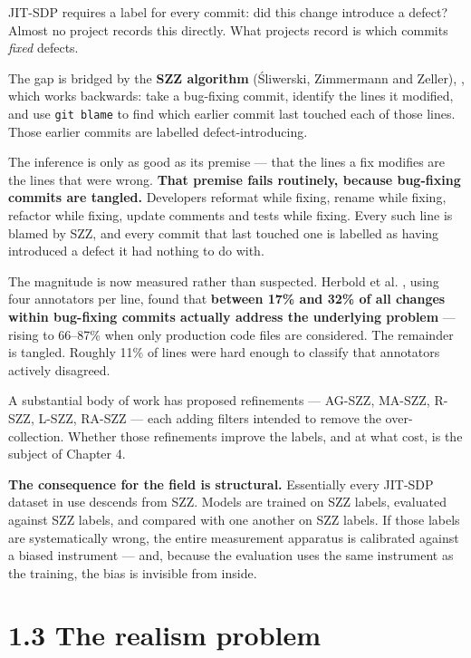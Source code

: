 JIT-SDP requires a label for every commit: did this change introduce a
defect? Almost no project records this directly. What projects record is
which commits \emph{fixed} defects.

The gap is bridged by the \textbf{SZZ algorithm} (\'{S}liwerski, Zimmermann
and Zeller), \citep{sliwerski2005szz}, which works backwards: take a
bug-fixing commit, identify the lines it modified, and use
\texttt{git\ blame} to find which earlier commit last touched each of
those lines. Those earlier commits are labelled defect-introducing.

The inference is only as good as its premise --- that the lines a fix
modifies are the lines that were wrong. \textbf{That premise fails
routinely, because bug-fixing commits are tangled.} Developers reformat
while fixing, rename while fixing, refactor while fixing, update
comments and tests while fixing. Every such line is blamed by SZZ, and
every commit that last touched one is labelled as having introduced a
defect it had nothing to do with.

The magnitude is now measured rather than suspected. Herbold et al.
\citep{herbold2022tangling}, using four annotators per line, found that
\textbf{between 17\% and 32\% of all changes within bug-fixing commits
actually address the underlying problem} --- rising to 66--87\% when
only production code files are considered. The remainder is tangled.
Roughly 11\% of lines were hard enough to classify that annotators
actively disagreed.

A substantial body of work has proposed refinements --- AG-SZZ, MA-SZZ,
R-SZZ, L-SZZ, RA-SZZ --- each adding filters intended to remove the
over-collection. Whether those refinements improve the labels, and at
what cost, is the subject of Chapter 4.

\textbf{The consequence for the field is structural.} Essentially every
JIT-SDP dataset in use descends from SZZ. Models are trained on SZZ
labels, evaluated against SZZ labels, and compared with one another on
SZZ labels. If those labels are systematically wrong, the entire
measurement apparatus is calibrated against a biased instrument --- and,
because the evaluation uses the same instrument as the training, the
bias is invisible from inside.

\section{1.3 The realism problem}\label{the-realism-problem}

